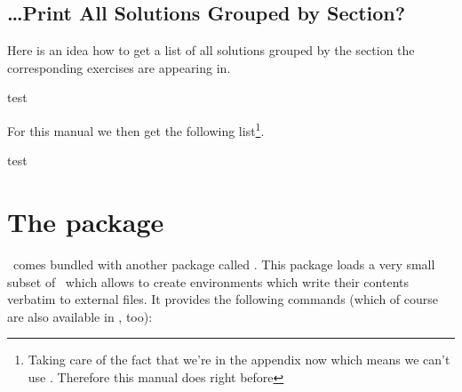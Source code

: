 \documentclass{xsim-manual}
\begin{document}

\subsection{\dots Print All Solutions Grouped by Section?}
Here is an idea how to get a list of all solutions grouped by the section the
corresponding exercises are appearing in.
\begin{sourcecode}

  \setcounter{sections}{1}
  \whileboolexpr
    { test {} }
    {
      \printsolutions[section=\value{sections},headings-template=per-section]
    }
\end{sourcecode}
For this manual we then get the following list\footnote{Taking care of the
  fact that we're in the appendix now which means we can't use
  .  Therefore this manual does
   right before
  }.

\setcounter{sections}{1}
\whileboolexpr
  { test {} }
  {
    \printsolutions[section=\value{sections},headings-template=per-section]
  }
    
\section{The  package}\label{sec:xsimverb-package}
\xsim\ comes bundled with another package called .  This package
loads a very small subset of \xsim\ which allows to create environments which
write their contents verbatim to external files.  It provides the following
commands (which of course are also available in \xsim, too):
\end{document}
